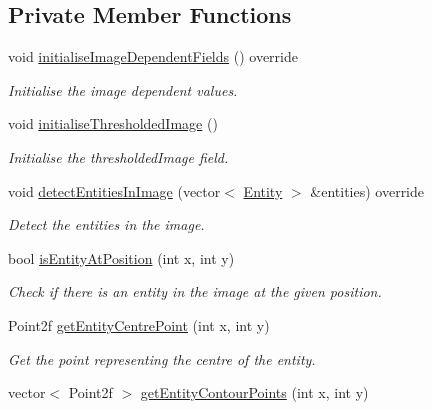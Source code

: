 \subsection*{Private Member Functions}
\begin{DoxyCompactItemize}
\item 
void \hyperlink{classmultiscale_1_1analysis_1_1SimulationClusterDetector_ace0c69bb809f52b8c48ab7564ea1d8e3}{initialise\-Image\-Dependent\-Fields} () override
\begin{DoxyCompactList}\small\item\em Initialise the image dependent values. \end{DoxyCompactList}\item 
void \hyperlink{classmultiscale_1_1analysis_1_1SimulationClusterDetector_ae36c793acaa548cc3ce74f72621d8bd7}{initialise\-Thresholded\-Image} ()
\begin{DoxyCompactList}\small\item\em Initialise the thresholded\-Image field. \end{DoxyCompactList}\item 
void \hyperlink{classmultiscale_1_1analysis_1_1SimulationClusterDetector_af3c2206724a69794e12f34fe7fe5082b}{detect\-Entities\-In\-Image} (vector$<$ \hyperlink{classmultiscale_1_1analysis_1_1Entity}{Entity} $>$ \&entities) override
\begin{DoxyCompactList}\small\item\em Detect the entities in the image. \end{DoxyCompactList}\item 
bool \hyperlink{classmultiscale_1_1analysis_1_1SimulationClusterDetector_a886031cb8d576c4cf380c1105eeee4d2}{is\-Entity\-At\-Position} (int x, int y)
\begin{DoxyCompactList}\small\item\em Check if there is an entity in the image at the given position. \end{DoxyCompactList}\item 
Point2f \hyperlink{classmultiscale_1_1analysis_1_1SimulationClusterDetector_a083c8ff51e483d86744961aca1ae3551}{get\-Entity\-Centre\-Point} (int x, int y)
\begin{DoxyCompactList}\small\item\em Get the point representing the centre of the entity. \end{DoxyCompactList}\item 
vector$<$ Point2f $>$ \hyperlink{classmultiscale_1_1analysis_1_1SimulationClusterDetector_ae51328d7fe0e477dea162c7e99da45c2}{get\-Entity\-Contour\-Points} (int x, int y)

\end{DoxyCompactItemize}
